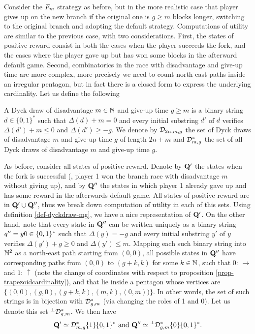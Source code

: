 Consider the $F_m$ strategy as before, but in the more realistic case that player gives up on the new branch if the original one is $g\geq m$ blocks longer, switching to the original branch and adopting the default strategy. Computations of utility are similar to the previous case, with two considerations. First, the states of positive reward consist in both the cases when the player succeeds the fork, and the cases where the player gave up but has won some blocks in the afterward default game. Second, combinatorics in the race with disadvantage and give-up time are more complex, more precisely we need to count north-east paths inside an irregular pentagon, but in fact there is a closed form to express the underlying cardinality. Let us define the following
	
	\begin{mydef}
		\label{def-dyckdraw-mg}
		A Dyck draw of disadvantage $m\in\mathbb{N}$ and give-up time $g\geq m$ is a binary string $d\in\{0,1\}^\ast$ such that $\Delta(d)+m=0$ and every initial substring $d'$ of $d$ verifies $\Delta(d')+m\leq 0$ and $\Delta(d')\geq -g$. We denote by $\mathcal{D}_{2n,m,g}$ the set of Dyck draws of disadvantage $m$ and give-up time $g$ of length $2n+m$ and $\mathcal{D}^\ast_{m,g}$ the set of all Dyck draws of disadvantage $m$ and give-up time $g$.
	\end{mydef}
	
As before, consider all states of positive reward. Denote by $\mathbf{Q}'$ the states when the fork is successful (\ie, player 1 won the branch race with disadvantage $m$ without giving up), and by $\mathbf{Q}''$ the states in which player 1 already gave up and has some reward in the afterwards default game. All states of positive reward are in $\mathbf{Q}'\cup\mathbf{Q}''$, thus we break down computation of utility in each of this sets. Using definition \ref{def-dyckdraw-mg}, we have a nice representation of $\mathbf{Q}'$. On the other hand, note that every state in $\mathbf{Q}''$ can be written uniquely as a binary string $q''= y0\in\{0,1\}^\ast $ such that $\Delta(y)=-g$ and every initial substring $y'$ of $y$ verifies $\Delta(y')+g\geq 0$ and $\Delta(y')\leq m$. Mapping each such binary string into $\mathbb{N}^2$ as a north-east path starting from $(0,0)$, all possible states in $\mathbf{Q}''$ have corresponding paths from $(0,0)$ to $(g+k,k)$ for some $k\in \mathbb{N}$, such that $0:\,\rightarrow$ and $1:\,\uparrow$ (note the change of coordinates with respect to proposition \ref{prop-trapezoidcardinality}), and that lie inside a pentagon whose vertices are $\{(0,0),(g,0),(g+k,k),(m,k),(0,m))\}$. In other words, the set of such strings is in bijection with $\mathcal{D}_{g,m}^\ast$ (via changing the roles of 1 and 0). Let us denote this set ${}^\perp\mathcal{D}_{g,m}^\ast$. We then have
$$\mathbf{Q}' \simeq \mathcal{D}^\ast_{m,g}\{1\}\{0,1\}^\ast\mbox{ and }\mathbf{Q}''\simeq {}^\perp\mathcal{D}^{\ast}_{g,m}\{0\}\{0,1\}^\ast.$$


